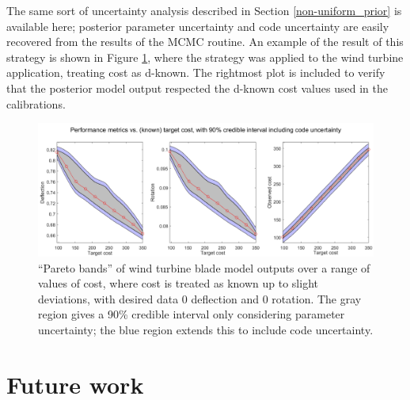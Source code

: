 \documentclass{article}
\begin{document}
The same sort of uncertainty analysis described in Section \ref{non-uniform_prior} is available here; posterior parameter uncertainty and code uncertainty are easily recovered from the results of the MCMC routine. An example of the result of this strategy is shown in Figure \ref{fig:known_cost}, where the strategy was applied to the wind turbine application, treating cost as d-known. The rightmost plot is included to verify that the posterior model output respected the d-known cost values used in the calibrations.

\begin{figure}
\centering
\includegraphics[width=.9\linewidth]{FIG_costs_code_uncert}
\captionsetup{width=.9\linewidth}
\caption{``Pareto bands'' of wind turbine blade model outputs over a range of values of cost, where cost is treated as known up to slight deviations, with desired data 0 deflection and 0 rotation. The gray region gives a 90\% credible interval only considering parameter uncertainty; the blue region extends this to include code uncertainty.}
\label{fig:known_cost}
\end{figure}





\section{Future work}
\end{document}
